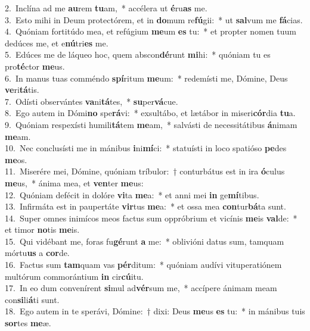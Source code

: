{2.~}Inclína ad me \textbf{au}rem \textbf{tu}am,~* accélera ut \textbf{é}ru\textbf{as} me.\\
{3.~}Esto mihi in Deum protectórem, et in \textbf{do}mum re\textbf{fú}gii:~* ut \textbf{sal}vum me \textbf{fá}cias.\\
{4.~}Quóniam fortitúdo mea, et refúgium \textbf{me}um \textbf{es} tu:~* et propter nomen tuum dedúces me, et e\textbf{nú}tri\textbf{es} me.\\
{5.~}Edúces me de láqueo hoc, quem abscon\textbf{dé}runt \textbf{mi}hi:~* quóniam tu es pro\textbf{té}ctor \textbf{me}us.\\
{6.~}In manus tuas comméndo \textbf{spí}ritum \textbf{me}um:~* redemísti me, Dómine, Deus \textbf{ve}ri\textbf{tá}tis.\\
{7.~}Odísti observántes \textbf{va}ni\textbf{tá}tes,~* \textbf{su}per\textbf{vá}cue.\\
{8.~}Ego autem in Dómi\textbf{no} spe\textbf{rá}vi:~* exsultábo, et lætábor in miseri\textbf{cór}dia \textbf{tu}a.\\
{9.~}Quóniam respexísti humili\textbf{tá}tem \textbf{me}am,~* salvásti de necessitátibus \textbf{á}nimam \textbf{me}am.\\
{10.~}Nec conclusísti me in mánibus \textbf{i}ni\textbf{mí}ci:~* statuísti in loco spatióso \textbf{pe}des \textbf{me}os.\\
{11.~}Miserére mei, Dómine, quóniam tríbulor:~† conturbátus est in ira \textbf{ó}culus \textbf{me}us,~* ánima mea, et \textbf{ven}ter \textbf{me}us:\\
{12.~}Quóniam defécit in dolóre \textbf{vi}ta \textbf{me}a:~* et anni mei \textbf{in} ge\textbf{mí}tibus.\\
{13.~}Infirmáta est in paupertáte \textbf{vir}tus \textbf{me}a:~* et ossa mea \textbf{con}tur\textbf{bá}ta sunt.\\
{14.~}Super omnes inimícos meos factus sum oppróbrium et vicínis \textbf{me}is \textbf{val}de:~* et timor \textbf{no}tis \textbf{me}is.\\
{15.~}Qui vidébant me, foras fu\textbf{gé}runt \textbf{a} me:~* oblivióni datus sum, tamquam mórtu\textbf{us} a \textbf{cor}de.\\
{16.~}Factus sum \textbf{tam}quam vas \textbf{pér}ditum:~* quóniam audívi vituperatiónem multórum commorántium \textbf{in} cir\textbf{cú}itu.\\
{17.~}In eo dum convenírent \textbf{si}mul ad\textbf{vér}sum me,~* accípere ánimam meam con\textbf{si}li\textbf{á}ti sunt.\\
{18.~}Ego autem in te sperávi, Dómine:~† dixi: Deus \textbf{me}us \textbf{es} tu:~* in mánibus tuis \textbf{sor}tes \textbf{me}æ.\\
